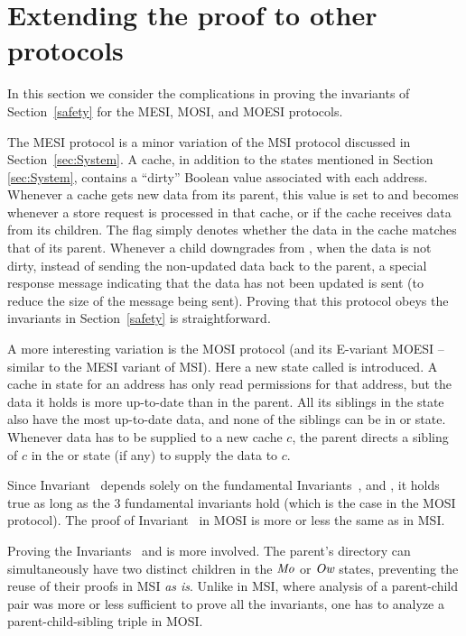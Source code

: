 \section{Extending the proof to other protocols}
\label{sec:Refinements}

In this section we consider the complications in proving the invariants
of Section~\ref{safety} for the MESI, MOSI, and MOESI protocols.

The MESI protocol is a minor variation of the MSI protocol discussed in Section~\ref{sec:System}.
A cache, in addition to the states mentioned in Section
\ref{sec:System}, contains a ``dirty'' Boolean value associated with each
address.  Whenever a cache gets new data from its parent, this value is set to
\False{} and becomes \True{} whenever a store request is processed in that
cache, or if the cache receives data from its children. The flag simply denotes
whether the data in the cache matches that of its parent.  Whenever a
child downgrades from \Mo{}, when the data is not dirty, instead of sending the
non-updated data back to the parent, a special response message indicating that
the data has not been updated is sent (to reduce the size of the message being
sent). Proving that this protocol obeys the invariants in Section~\ref{safety}
is straightforward.

A more interesting variation is the MOSI protocol (and its E-variant MOESI --
similar to the MESI variant of MSI). Here a new state called \Ow{} is
introduced. A cache in \Ow{} state for an address has only read permissions for
that address, but the data it holds is more up-to-date than in the parent.  All
its siblings in the \Sh{} state also have the most up-to-date data, and none of
the siblings can be in \Mo{} or \Ow{} state.  Whenever data has to be supplied
to a new cache $c$, the parent directs a sibling of $c$ in the \Ow{} or \Mo{}
state (if any) to supply the data to $c$.

Since Invariant~ depends solely on the fundamental Invariants~,  and , it holds true
as long as the 3 fundamental invariants hold (which is the case in the MOSI
protocol). The proof of Invariant~ in MOSI is more
or less the same as in MSI.

Proving the Invariants~ and
 is more involved. The parent's directory can
simultaneously have two distinct children in the $\textit{Mo}$ or $\textit{Ow}$ states,
preventing the reuse of their proofs in MSI \emph{as is}. Unlike in MSI, where
analysis of a parent-child pair was more or less sufficient to prove all the
invariants, one has to analyze a parent-child-sibling triple in MOSI.
